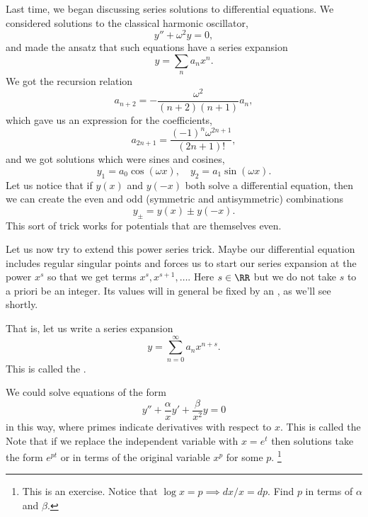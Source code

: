 Last time, we began discussing series solutions to differential equations.
We considered solutions to the classical harmonic oscillator,
\begin{equation}
    y'' + \omega^2 y = 0,
\end{equation}
and made the ansatz that such equations have a series expansion
\begin{equation}
    y= \sum_n a_n x^n.
\end{equation}
We got the recursion relation
\begin{equation}
     a_{n+2} = -\frac{\omega^2}{(n+2)(n+1)}a_n,
\end{equation}
which gave us an expression for the coefficients,
\begin{equation}
    a_{2n+1} = \frac{(-1)^n \omega^{2n+1}}{(2n+1)!},
\end{equation}
and we got solutions which were sines and cosines,
\begin{equation}
    y_1 = a_0 \cos(\omega x), \quad y_2 = a_1 \sin(\omega x).
\end{equation}
Let us notice that if $y(x)$ and $y(-x)$ both solve a differential equation, then we can create the even and odd (symmetric and antisymmetric) combinations
\begin{equation}
    y_\pm = y(x) \pm y(-x).
\end{equation}
This sort of trick works for potentials that are themselves even.

Let us now try to extend this power series trick. Maybe our differential equation includes regular singular points and forces us to start our series expansion at the power $x^s$ so that we get terms $x^s, x^{s+1},\ldots$. Here $s\in\RR$ but we do not take $s$ to a priori be an integer. Its values will in general be fixed by an , as we'll see shortly.

That is, let us write a series expansion
\begin{equation}
    y = \sum_{n=0}^\infty a_n x^{n+s}.
\end{equation}
This is called the .

We could solve equations of the form
\begin{equation}
    y'' + \frac{\alpha}{x} y' + \frac{\beta}{x^2}y=0
\end{equation}
in this way, where primes indicate derivatives with respect to $x$. This is called the  Note that if we replace the independent variable with $x = e^t$ then solutions take the form $e^{pt}$ or in terms of the original variable $x^p$ for some $p$.%
    \footnote{This is an exercise. Notice that $\log x = p \implies dx/x = dp$. Find $p$ in terms of $\alpha$ and $\beta$.}

